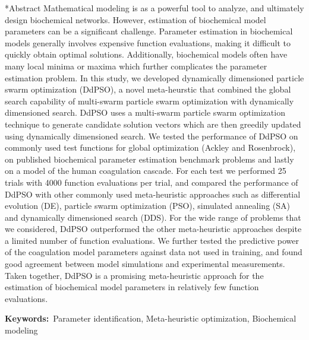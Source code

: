 \documentclass[12pt]{article}
\makeatletter
\renewcommand\section{\@startsection
	{subsection}{2}{0mm}
	{-0.2in}
	{0.05\baselineskip}
	{\normalfont\large\bfseries}}
\makeatother
\begin{document}
\section*{Abstract}
Mathematical modeling is as a powerful tool to analyze, and ultimately design biochemical networks.
However, estimation of biochemical model parameters can be a significant challenge.
Parameter estimation in biochemical models generally involves expensive function evaluations, making it difficult to quickly obtain optimal solutions.
Additionally, biochemical models often have many local minima or maxima which further complicates the parameter estimation problem.
In this study, we developed dynamically dimensioned particle swarm optimization (DdPSO), a novel meta-heurstic that combined the global search capability of multi-swarm particle swarm optimization with dynamically dimensioned search. DdPSO uses a multi-swarm particle swarm optimization technique to generate candidate solution vectors which are then greedily updated using dynamically dimensioned search. We tested the performance of DdPSO on commonly used test functions for global optimization (Ackley and Rosenbrock), on published biochemical parameter estimation benchmark problems and
lastly on a model of the human coagulation cascade. For each test we performed 25 trials with 4000 function evaluations per trial, and compared the performance of DdPSO with other commonly
used meta-heuristic approaches such as differential evolution (DE), particle swarm optimization (PSO), simulated annealing (SA) and dynamically dimensioned search (DDS).
For the wide range of problems that we considered, DdPSO outperformed the other meta-heuristic approaches despite a limited number of function evaluations.
We further tested the predictive power of the coagulation model parameters against data not used in training, and found good agreement between model simulations and experimental measurements.
Taken together, DdPSO is a promising meta-heuristic approach for the estimation of biochemical model parameters in relatively few function evaluations.

{\noindent \textbf{Keywords:}~Parameter identification, Meta-heuristic optimization, Biochemical modeling}

\end{document}
